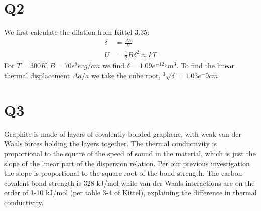 \documentclass[a4paper,11pt]{article}
\numberwithin{equation}{section}
\begin{document}
\section*{Q2}
We first calculate the dilation from Kittel 3.35:
\begin{align}
 \delta &= \frac{\Delta V}{V} \\
 U &= \frac{1}{2}B\delta^2 \approx kT
\end{align}
For $T=300K, B=70e^9 erg/cm$ we find $\delta = 1.09e^{-12} cm^3$.
To find the linear thermal displacement $\Delta a/a$ we take the cube root, $^3\sqrt{\delta} = 1.03e^-9 cm$.

\section*{Q3}
Graphite is made of layers of covalently-bonded graphene, with weak van der Waals forces holding the layers together. 
The thermal conductivity is proportional to the square of the speed of sound in the material, which is just the slope of the linear part of the dispersion relation.
Per our previous investigation the slope is proportional to the square root of the bond strength.
The carbon covalent bond strength is 328 kJ/mol while van der Waals interactions are on the order of 1-10 kJ/mol (per table 3-4 of Kittel), explaining the difference in thermal conductivity.
\end{document}
